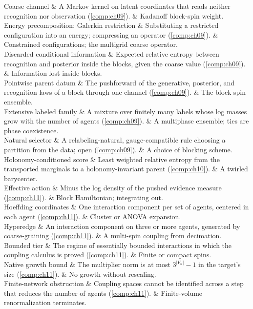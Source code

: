 \begin{decoder}
Coarse channel & A Markov kernel on latent coordinates that reads neither recognition nor observation (\cref{comp:ch09}). & Kadanoff block-spin weight. \\
Energy precomposition; Galerkin restriction & Substituting a restricted configuration into an energy; compressing an operator (\cref{comp:ch09}). & Constrained configurations; the multigrid coarse operator. \\
Discarded conditional information & Expected relative entropy between recognition and posterior inside the blocks, given the coarse value (\cref{comp:ch09}). & Information lost inside blocks. \\
Pointwise parent datum & The pushforward of the generative, posterior, and recognition laws of a block through one channel (\cref{comp:ch09}). & The block-spin ensemble. \\
Extensive labeled family & A mixture over finitely many labels whose log masses grow with the number of agents (\cref{comp:ch09}). & A multiphase ensemble; ties are phase coexistence. \\
Natural selector & A relabeling-natural, gauge-compatible rule choosing a partition from the data; open (\cref{comp:ch09}). & A choice of blocking scheme. \\
Holonomy-conditioned score & Least weighted relative entropy from the transported marginals to a holonomy-invariant parent (\cref{comp:ch10}). & A twirled barycenter. \\
Effective action & Minus the log density of the pushed evidence measure (\cref{comp:ch11}). & Block Hamiltonian; integrating out. \\
Hoeffding coordinates & One interaction component per set of agents, centered in each agent (\cref{comp:ch11}). & Cluster or ANOVA expansion. \\
Hyperedge & An interaction component on three or more agents, generated by coarse-graining (\cref{comp:ch11}). & A multi-spin coupling from decimation. \\
Bounded tier & The regime of essentially bounded interactions in which the coupling calculus is proved (\cref{comp:ch11}). & Finite or compact spins. \\
Native growth bound & The multiplier norm is at most $3^{|V_n|}-1$ in the target's size (\cref{comp:ch11}). & No growth without rescaling. \\
Finite-network obstruction & Coupling spaces cannot be identified across a step that reduces the number of agents (\cref{comp:ch11}). & Finite-volume renormalization terminates. \\

\end{decoder}
